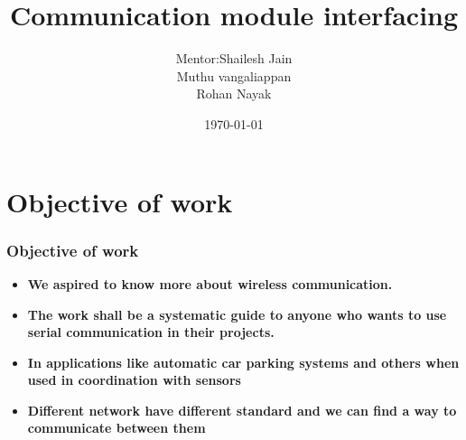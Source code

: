 \documentclass[table,10pt,blue]{beamer}	%
\title
[
	Communication module interfacing	%
	\hspace{0.5cm}
	\insertframenumber/\inserttotalframenumber
]
{
	Communication module interfacing
}
\author
[
	www.e-yantra.org 	%
]
{
	Mentor:Shailesh Jain \\
  Muthu vangaliappan\\
  Rohan Nayak\\
}
\date
{
\today	%
}
\begin{document}

\begin{frame}	%
	\titlepage %
\end{frame}

{
\section{Objective of work} %
\begin{frame} 
	\frametitle{Objective of work} 
	\begin{itemize} \color{blue} %
		\item \textbf{We aspired to know more about wireless communication.}	
		\item \textbf{The work shall be a systematic guide to anyone who wants to use serial communication in their projects.}
		\item \textbf{In applications like automatic car parking systems and others when used in coordination with sensors}
		\item \textbf{Different network have different standard and we can find a way to communicate between them} \color{black}
\end{itemize}

\end{frame}
}
\end{document}
